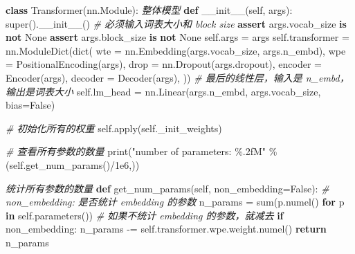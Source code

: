 \documentclass[
]{article}
\newenvironment{Shaded}{}{}
\newcommand{\BuiltInTok}[1]{\textcolor[rgb]{0.00,0.50,0.00}{#1}}
\newcommand{\CommentTok}[1]{\textcolor[rgb]{0.38,0.63,0.69}{\textit{#1}}}
\newcommand{\ControlFlowTok}[1]{\textcolor[rgb]{0.00,0.44,0.13}{\textbf{#1}}}
\newcommand{\FloatTok}[1]{\textcolor[rgb]{0.25,0.63,0.44}{#1}}
\newcommand{\FunctionTok}[1]{\textcolor[rgb]{0.02,0.16,0.49}{#1}}
\newcommand{\KeywordTok}[1]{\textcolor[rgb]{0.00,0.44,0.13}{\textbf{#1}}}
\newcommand{\NormalTok}[1]{#1}
\newcommand{\OperatorTok}[1]{\textcolor[rgb]{0.40,0.40,0.40}{#1}}
\newcommand{\SpecialCharTok}[1]{\textcolor[rgb]{0.25,0.44,0.63}{#1}}
\newcommand{\StringTok}[1]{\textcolor[rgb]{0.25,0.44,0.63}{#1}}
\newcommand{\VariableTok}[1]{\textcolor[rgb]{0.10,0.09,0.49}{#1}}
\begin{document}
\begin{Shaded}
\begin{Highlighting}[]
\KeywordTok{class}\NormalTok{ Transformer(nn.Module):}
   \CommentTok{\textquotesingle{}\textquotesingle{}\textquotesingle{}整体模型\textquotesingle{}\textquotesingle{}\textquotesingle{}}
    \KeywordTok{def} \FunctionTok{\_\_init\_\_}\NormalTok{(}\VariableTok{self}\NormalTok{, args):}
        \BuiltInTok{super}\NormalTok{().}\FunctionTok{\_\_init\_\_}\NormalTok{()}
        \CommentTok{\# 必须输入词表大小和 block size}
        \ControlFlowTok{assert}\NormalTok{ args.vocab\_size }\KeywordTok{is} \KeywordTok{not} \VariableTok{None}
        \ControlFlowTok{assert}\NormalTok{ args.block\_size }\KeywordTok{is} \KeywordTok{not} \VariableTok{None}
        \VariableTok{self}\NormalTok{.args }\OperatorTok{=}\NormalTok{ args}
        \VariableTok{self}\NormalTok{.transformer }\OperatorTok{=}\NormalTok{ nn.ModuleDict(}\BuiltInTok{dict}\NormalTok{(}
\NormalTok{            wte }\OperatorTok{=}\NormalTok{ nn.Embedding(args.vocab\_size, args.n\_embd),}
\NormalTok{            wpe }\OperatorTok{=}\NormalTok{ PositionalEncoding(args),}
\NormalTok{            drop }\OperatorTok{=}\NormalTok{ nn.Dropout(args.dropout),}
\NormalTok{            encoder }\OperatorTok{=}\NormalTok{ Encoder(args),}
\NormalTok{            decoder }\OperatorTok{=}\NormalTok{ Decoder(args),}
\NormalTok{        ))}
        \CommentTok{\# 最后的线性层，输入是 n\_embd，输出是词表大小}
        \VariableTok{self}\NormalTok{.lm\_head }\OperatorTok{=}\NormalTok{ nn.Linear(args.n\_embd, args.vocab\_size, bias}\OperatorTok{=}\VariableTok{False}\NormalTok{)}

        \CommentTok{\# 初始化所有的权重}
        \VariableTok{self}\NormalTok{.}\BuiltInTok{apply}\NormalTok{(}\VariableTok{self}\NormalTok{.\_init\_weights)}

        \CommentTok{\# 查看所有参数的数量}
        \BuiltInTok{print}\NormalTok{(}\StringTok{"number of parameters: }\SpecialCharTok{\%.2f}\StringTok{M"} \OperatorTok{\%}\NormalTok{ (}\VariableTok{self}\NormalTok{.get\_num\_params()}\OperatorTok{/}\FloatTok{1e6}\NormalTok{,))}

    \CommentTok{\textquotesingle{}\textquotesingle{}\textquotesingle{}统计所有参数的数量\textquotesingle{}\textquotesingle{}\textquotesingle{}}
    \KeywordTok{def}\NormalTok{ get\_num\_params(}\VariableTok{self}\NormalTok{, non\_embedding}\OperatorTok{=}\VariableTok{False}\NormalTok{):}
        \CommentTok{\# non\_embedding: 是否统计 embedding 的参数}
\NormalTok{        n\_params }\OperatorTok{=} \BuiltInTok{sum}\NormalTok{(p.numel() }\ControlFlowTok{for}\NormalTok{ p }\KeywordTok{in} \VariableTok{self}\NormalTok{.parameters())}
        \CommentTok{\# 如果不统计 embedding 的参数，就减去}
        \ControlFlowTok{if}\NormalTok{ non\_embedding:}
\NormalTok{            n\_params }\OperatorTok{{-}=} \VariableTok{self}\NormalTok{.transformer.wpe.weight.numel()}
        \ControlFlowTok{return}\NormalTok{ n\_params}


\end{Highlighting}
\end{Shaded}
\end{document}
